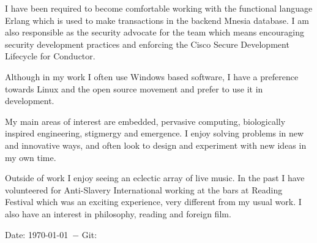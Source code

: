 \documentclass[overlapped,line,letterpaper]{res}
\begin{document}
\begin{resume}
I have been required to become comfortable working with the functional
language Erlang which is used to make transactions in the backend Mnesia database.
I am also responsible as the security advocate for the team which means encouraging
security development practices and enforcing the Cisco Secure Development Lifecycle
for Conductor.

Although in my work I often use Windows based software, I have a preference towards
Linux and the open source movement and prefer to use it in development.

My main areas of interest are embedded, pervasive computing, biologically
inspired engineering, stigmergy and emergence.
I enjoy solving problems in new and innovative ways, and often look to design and
experiment with new ideas in my own time.

Outside of work I enjoy seeing an eclectic array of live music. In the past I
have volunteered for Anti-Slavery International working at the bars at Reading
Festival which was an exciting experience, very different from my usual work.
I also have an interest in philosophy, reading and foreign film.


\begin{center}
    {\tiny \rm $ $Date: \today \ $-$ Git:  $ $ }
\end{center}

\end{resume}
\end{document}
